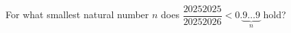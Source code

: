 For what smallest natural number $n$ does $\dfrac{20252025}{20252026}<0.\underbrace{9\ldots9}_{n}$ hold?
